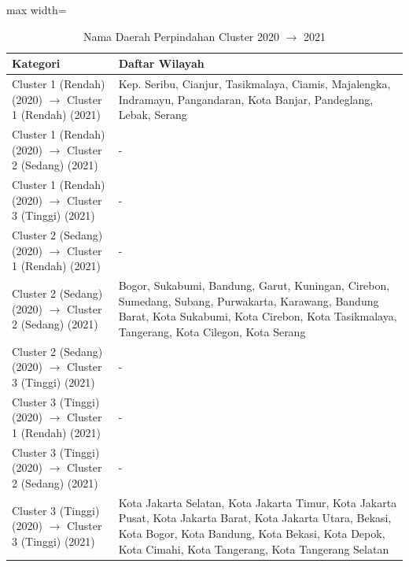 \begin{table}[H]
\centering
\caption{Nama Daerah Perpindahan Cluster 2020 \(\rightarrow\) 2021} \label{tab:app1transname2020x2021}
\begin{adjustbox}{max width=\textwidth}
\begin{tabular}{|p{4cm}|p{10cm}|}
\hline
\textbf{Kategori} & \textbf{Daftar Wilayah} \\
\hline
Cluster 1 (Rendah) (2020) \(\rightarrow\) Cluster 1 (Rendah) (2021) & Kep. Seribu, Cianjur, Tasikmalaya, Ciamis, Majalengka, Indramayu, Pangandaran, Kota Banjar, Pandeglang, Lebak, Serang \\
\hline
Cluster 1 (Rendah) (2020) \(\rightarrow\) Cluster 2 (Sedang) (2021) & - \\
\hline
Cluster 1 (Rendah) (2020) \(\rightarrow\) Cluster 3 (Tinggi) (2021) & - \\
\hline
Cluster 2 (Sedang) (2020) \(\rightarrow\) Cluster 1 (Rendah) (2021) & - \\
\hline
Cluster 2 (Sedang) (2020) \(\rightarrow\) Cluster 2 (Sedang) (2021) & Bogor, Sukabumi, Bandung, Garut, Kuningan, Cirebon, Sumedang, Subang, Purwakarta, Karawang, Bandung Barat, Kota Sukabumi, Kota Cirebon, Kota Tasikmalaya, Tangerang, Kota Cilegon, Kota Serang \\
\hline
Cluster 2 (Sedang) (2020) \(\rightarrow\) Cluster 3 (Tinggi) (2021) & - \\
\hline
Cluster 3 (Tinggi) (2020) \(\rightarrow\) Cluster 1 (Rendah) (2021) & - \\
\hline
Cluster 3 (Tinggi) (2020) \(\rightarrow\) Cluster 2 (Sedang) (2021) & - \\
\hline
Cluster 3 (Tinggi) (2020) \(\rightarrow\) Cluster 3 (Tinggi) (2021) & Kota Jakarta Selatan, Kota Jakarta Timur, Kota Jakarta Pusat, Kota Jakarta Barat, Kota Jakarta Utara, Bekasi, Kota Bogor, Kota Bandung, Kota Bekasi, Kota Depok, Kota Cimahi, Kota Tangerang, Kota Tangerang Selatan \\
\hline
\end{tabular}
\end{adjustbox}
\end{table}